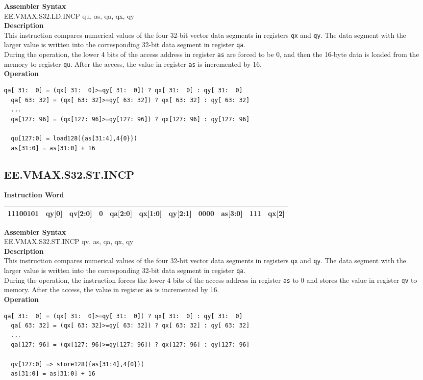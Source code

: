 \textbf{Assembler Syntax} \\
EE.VMAX.S32.LD.INCP qu, as, qa, qx, qy \\
\textbf{Description} \\
This instruction compares numerical values of the four 32-bit vector data segments in registers \lstinline{qx} and \lstinline{qy}. The data segment with the larger value is written into the corresponding 32-bit data segment in register \lstinline{qa}.\\
During the operation, the lower 4 bits of the access address in register \lstinline{as} are forced to be 0, and then the 16-byte data is loaded from the memory to register \lstinline{qu}. After the access, the value in register \lstinline{as} is incremented by 16.\\
\textbf{Operation}
\begin{lstlisting}[escapeinside=`?]
  qa[ 31:  0] = (qx[ 31:  0]>=qy[ 31:  0]) ? qx[ 31:  0] : qy[ 31:  0]
  qa[ 63: 32] = (qx[ 63: 32]>=qy[ 63: 32]) ? qx[ 63: 32] : qy[ 63: 32]
  ...
  qa[127: 96] = (qx[127: 96]>=qy[127: 96]) ? qx[127: 96] : qy[127: 96]

  qu[127:0] = load128({as[31:4],4{0}})
  as[31:0] = as[31:0] + 16
\end{lstlisting}

\clearpage
\subsection{EE.VMAX.S32.ST.INCP}\label{instruction:EEVMAXS32STINCP}
\setlength\tabcolsep{6pt}
\textbf{Instruction Word} \\
\begin{tabular}{|c|c|c|c|c|c|c|c|c|c|c|}
	\hline
	11100101 & qy[0] & qv[2:0] & 0 & qa[2:0] & qx[1:0] & qy[2:1] & 0000 & as[3:0] & 111 & qx[2] \\
	\hline
\end{tabular}

\textbf{Assembler Syntax} \\
EE.VMAX.S32.ST.INCP qv, as, qa, qx, qy \\
\textbf{Description} \\
This instruction compares numerical values of the four 32-bit vector data segments in registers \lstinline{qx} and \lstinline{qy}. The data segment with the larger value is written into the corresponding 32-bit data segment in register \lstinline{qa}.\\
During the operation, the instruction forces the lower 4 bits of the access address in register \lstinline{as} to 0 and stores the value in register \lstinline{qv} to memory. After the access, the value in register \lstinline{as} is incremented by 16.\\
\textbf{Operation}
\begin{lstlisting}[escapeinside=`?]
  qa[ 31:  0] = (qx[ 31:  0]>=qy[ 31:  0]) ? qx[ 31:  0] : qy[ 31:  0]
  qa[ 63: 32] = (qx[ 63: 32]>=qy[ 63: 32]) ? qx[ 63: 32] : qy[ 63: 32]
  ...
  qa[127: 96] = (qx[127: 96]>=qy[127: 96]) ? qx[127: 96] : qy[127: 96]

  qv[127:0] => store128({as[31:4],4{0}})
  as[31:0] = as[31:0] + 16
\end{lstlisting}

